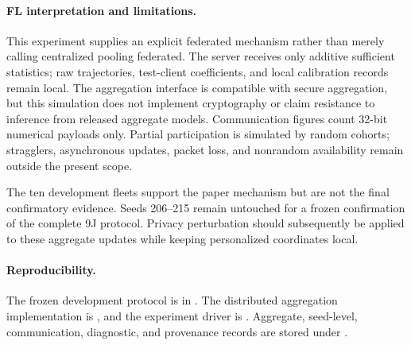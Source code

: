 \paragraph{FL interpretation and limitations.}
This experiment supplies an explicit federated mechanism rather than merely
calling centralized pooling federated. The server receives only additive
sufficient statistics; raw trajectories, test-client coefficients, and local
calibration records remain local. The aggregation interface is compatible with
secure aggregation, but this simulation does not implement cryptography or
claim resistance to inference from released aggregate models. Communication
figures count 32-bit numerical payloads only. Partial participation is simulated
by random cohorts; stragglers, asynchronous updates, packet loss, and nonrandom
availability remain outside the present scope.

The ten development fleets support the paper mechanism but are not the final
confirmatory evidence. Seeds 206--215 remain untouched for a frozen confirmation
of the complete 9J protocol. Privacy perturbation should subsequently be applied
to these aggregate updates while keeping personalized coordinates local.

\paragraph{Reproducibility.}
The frozen development protocol is in
. The distributed aggregation implementation
is , and the experiment driver
is . Aggregate,
seed-level, communication, diagnostic, and provenance records are stored under
.
